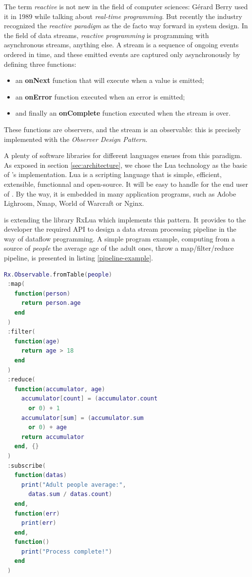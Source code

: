The term \textit{reactive} is not new in the field of computer sciences: Gérard Berry used it in 1989 while talking about \textit{real-time programming}\cite{berry:realtime_programming}.
But recently the industry recognized the \textit{reactive paradigm} as the de facto way forward in system design\cite{malawski:why_reactive}.
In the field of data streams, \textit{reactive programming} is programming with asynchronous streams, anything else.
A stream is a sequence of ongoing events ordered in time, and these emitted events are captured only asynchronously by defining three functions:

\begin{itemize}
  \item an \textbf{onNext} function that will execute when a value is emitted;
  \item an \textbf{onError} function executed when an error is emitted;
  \item and finally an \textbf{onComplete} function executed when the stream is over.
\end{itemize}

These functions are observers, and the stream is an observable: this is precisely implemented with the \textit{Observer Design Pattern}\cite{szallies_using_1997}.

A plenty of software libraries for different languages ensues from this paradigm\cite{reactive_streams}\cite{github:reactive_streams}.
As exposed in section \ref{sec:architecture}, we chose the Lua technology as the basic of \SYS's implementation.
Lua is a scripting language that is simple, efficient, extensible, functionnal and open-source\cite{ierusalimschy_programming_2006}.
It will be easy to handle for the end user of \SYS.
By the way, it is embedded in many application programs, such as Adobe Lighroom, Nmap, World of Warcraft or Nginx.

\SYS is extending the library RxLua\cite{github:rxlua} which implements this pattern.
It provides to the developer the required API to design a data stream processing pipeline in the way of dataflow programming\cite{uustalu_essence_2005}.
A simple program example, computing from a source of \textit{people} the average age of the adult ones, throw a map/filter/reduce pipeline, is presented in listing \ref{pipeline-example}.


\begin{minipage}{\linewidth}
\begin{lstlisting}[language=LUA,caption={Process pipeline example, using the library RxLua},label=pipeline-example]
Rx.Observable.fromTable(people)
 :map(
   function(person)
     return person.age
   end
 )
 :filter(
   function(age)
     return age > 18
   end
 )
 :reduce(
   function(accumulator, age)
     accumulator[count] = (accumulator.count
       or 0) + 1
     accumulator[sum] = (accumulator.sum
       or 0) + age
     return accumulator
   end, {}
 )
 :subscribe(
   function(datas)
     print("Adult people average:",
       datas.sum / datas.count)
   end,
   function(err)
     print(err)
   end,
   function()
     print("Process complete!")
   end
 )
\end{lstlisting}
\end{minipage}


